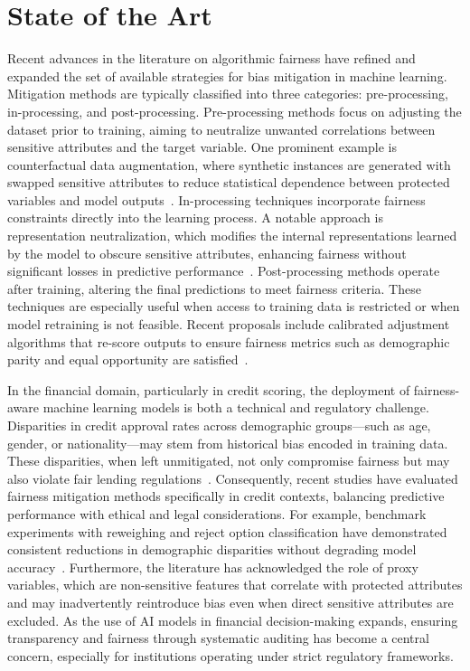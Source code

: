 \section{State of the Art}

Recent advances in the literature on algorithmic fairness have refined and expanded the set of available strategies for bias mitigation in machine learning. Mitigation methods are typically classified into three categories: pre-processing, in-processing, and post-processing. Pre-processing methods focus on adjusting the dataset prior to training, aiming to neutralize unwanted correlations between sensitive attributes and the target variable. One prominent example is counterfactual data augmentation, where synthetic instances are generated with swapped sensitive attributes to reduce statistical dependence between protected variables and model outputs~\cite{pessach2020}. In-processing techniques incorporate fairness constraints directly into the learning process. A notable approach is representation neutralization, which modifies the internal representations learned by the model to obscure sensitive attributes, enhancing fairness without significant losses in predictive performance~\cite{caton2020}. Post-processing methods operate after training, altering the final predictions to meet fairness criteria. These techniques are especially useful when access to training data is restricted or when model retraining is not feasible. Recent proposals include calibrated adjustment algorithms that re-score outputs to ensure fairness metrics such as demographic parity and equal opportunity are satisfied~\cite{mehrabi2021}.

In the financial domain, particularly in credit scoring, the deployment of fairness-aware machine learning models is both a technical and regulatory challenge. Disparities in credit approval rates across demographic groups—such as age, gender, or nationality—may stem from historical bias encoded in training data. These disparities, when left unmitigated, not only compromise fairness but may also violate fair lending regulations~\cite{fuster2020}. Consequently, recent studies have evaluated fairness mitigation methods specifically in credit contexts, balancing predictive performance with ethical and legal considerations. For example, benchmark experiments with reweighing and reject option classification have demonstrated consistent reductions in demographic disparities without degrading model accuracy~\cite{bellamy2019}. Furthermore, the literature has acknowledged the role of proxy variables, which are non-sensitive features that correlate with protected attributes and may inadvertently reintroduce bias even when direct sensitive attributes are excluded. As the use of AI models in financial decision-making expands, ensuring transparency and fairness through systematic auditing has become a central concern, especially for institutions operating under strict regulatory frameworks.
